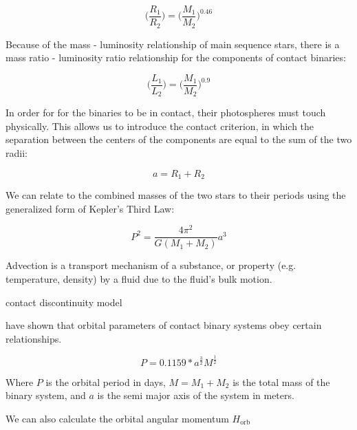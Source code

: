 \documentclass[12pt]{article} %
\numberwithin{equation}{section} %
\begin{document}
\begin{equation} \label{eqn: roche_mass_radius}
\bigg( \frac{R_{1}}{R_{2}} \bigg) = \bigg( \frac{M_{1}}{M_{2}} \bigg)^{0.46}
\end{equation}

Because of the mass - luminosity relationship of main sequence stars, there is a mass ratio - luminosity ratio relationship for the components of contact binaries: 

\begin{equation} \label{eqn: luminosity_radius}
\bigg( \frac{L_{1}}{L_{2}} \bigg) = \bigg( \frac{M_{1}}{M_{2}} \bigg)^{0.9}
\end{equation}


In order for for the binaries to be in contact, their photospheres must touch physically. This allows us to introduce the contact criterion, in which the separation between the centers of the components are equal to the sum of the two radii:

\begin{equation} \label{eqn: contact_criterion}
a = R_{1} + R_{2}
\end{equation}

We can relate to the combined masses of the two stars to their periods using the generalized form of Kepler's Third Law: 

\begin{equation} \label{eqn: kepler3}
P^{2} = \frac{4\pi^{2}}{G(M_{1} + M_{2})} a^{3}
\end{equation}


Advection is a transport mechanism of a substance, or property (e.g. temperature, density) by a fluid due to the fluid's bulk motion.

\citep{shu1976structure} contact discontinuity model

\citep{lubow1977structure}

\citet{gazeas2008angular} have shown that orbital parameters of contact binary systems obey certain relationships.

\begin{equation} \label{gazeas2008angular_6}
P = 0.1159 * a^{\frac{3}{2}} M^{\frac{1}{2}}
\end{equation}

Where $P$ is the orbital period in days, $M = M_{1} + M_{2}$ is the total mass of the binary system, and $a$ is the semi major axis of the system in meters.

We can also calculate the orbital angular momentum $H_{\text{orb}}$ 
\end{document}
